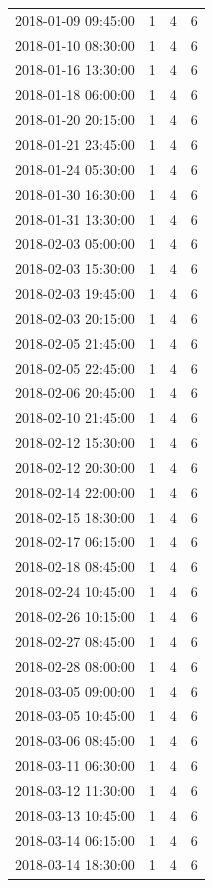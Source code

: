 \begin{tabular}{lrrr}
2018-01-09 09:45:00 & 1 & 4 & 6 \\
2018-01-10 08:30:00 & 1 & 4 & 6 \\
2018-01-16 13:30:00 & 1 & 4 & 6 \\
2018-01-18 06:00:00 & 1 & 4 & 6 \\
2018-01-20 20:15:00 & 1 & 4 & 6 \\
2018-01-21 23:45:00 & 1 & 4 & 6 \\
2018-01-24 05:30:00 & 1 & 4 & 6 \\
2018-01-30 16:30:00 & 1 & 4 & 6 \\
2018-01-31 13:30:00 & 1 & 4 & 6 \\
2018-02-03 05:00:00 & 1 & 4 & 6 \\
2018-02-03 15:30:00 & 1 & 4 & 6 \\
2018-02-03 19:45:00 & 1 & 4 & 6 \\
2018-02-03 20:15:00 & 1 & 4 & 6 \\
2018-02-05 21:45:00 & 1 & 4 & 6 \\
2018-02-05 22:45:00 & 1 & 4 & 6 \\
2018-02-06 20:45:00 & 1 & 4 & 6 \\
2018-02-10 21:45:00 & 1 & 4 & 6 \\
2018-02-12 15:30:00 & 1 & 4 & 6 \\
2018-02-12 20:30:00 & 1 & 4 & 6 \\
2018-02-14 22:00:00 & 1 & 4 & 6 \\
2018-02-15 18:30:00 & 1 & 4 & 6 \\
2018-02-17 06:15:00 & 1 & 4 & 6 \\
2018-02-18 08:45:00 & 1 & 4 & 6 \\
2018-02-24 10:45:00 & 1 & 4 & 6 \\
2018-02-26 10:15:00 & 1 & 4 & 6 \\
2018-02-27 08:45:00 & 1 & 4 & 6 \\
2018-02-28 08:00:00 & 1 & 4 & 6 \\
2018-03-05 09:00:00 & 1 & 4 & 6 \\
2018-03-05 10:45:00 & 1 & 4 & 6 \\
2018-03-06 08:45:00 & 1 & 4 & 6 \\
2018-03-11 06:30:00 & 1 & 4 & 6 \\
2018-03-12 11:30:00 & 1 & 4 & 6 \\
2018-03-13 10:45:00 & 1 & 4 & 6 \\
2018-03-14 06:15:00 & 1 & 4 & 6 \\
2018-03-14 18:30:00 & 1 & 4 & 6 \\

\end{tabular}
